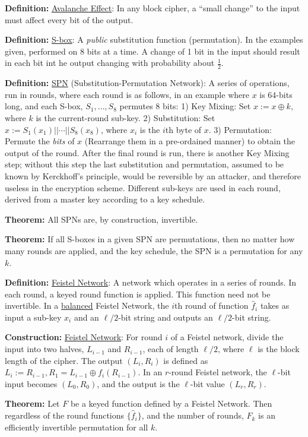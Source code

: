 \documentclass[10pt]{article}
\newcommand{\defn}[1]{{\bf Definition:} \underline{#1}}
\newcommand{\thm}[1]{{\bf Theorem:} \underline{#1}}
\newcommand{\con}[1]{{\bf Construction:} \underline{#1}}
\newcommand{\xor}{\oplus}
\begin{document}
\begin{multicols}{4}
\defn{Avalanche Effect}: In any block cipher, a ``small change'' to the input must affect every bit of the output.

\defn{S-box}: A {\it public} substitution function (permutation). In the examples given, performed on $8$ bits at a time. A change of 1 bit in the input should result in each bit int he output changing with probability about $\frac{1}{2}$.

\defn{SPN} (Substitution-Permutation Network): A series of operations, run in rounds, where each round is as follows, in an example where $x$ is 64-bits long, and each S-box, $S_1,\dots,S_8$ permutes $8$ bits: 1) Key Mixing: Set $x:=x\xor k$, where $k$ is the current-round sub-key. 2) Substitution: Set $x:=S_1(x_1)||\cdots||S_8(x_8)$, where $x_i$ is the $i$th byte of $x$. 3) Permutation: Permute the {\it bits} of $x$ (Rearrange them in a pre-ordained manner) to obtain the output of the round. After the final round is run, there is another Key Mixing step; without this step the last substitution and permutation, assumed to be known by Kerckhoff's principle, would be reversible by an attacker, and therefore useless in the encryption scheme. Different sub-keys are used in each round, derived from a master key according to a key schedule.

\thm{}All SPNs are, by construction, invertible.

\thm{}If all S-boxes in a given SPN are permutations, then no matter how many rounds are applied, and the key schedule, the SPN is a permutation for any $k$.

\defn{Feistel Network}: A network which operates in a series of rounds. In each round, a keyed round function is applied. This function need not be invertible. In a \underline{balanced} Feistel Network, the $i$th round of function $\hat{f}_i$ takes as input a sub-key $x_i$ and an $\ell/2$-bit string and outputs an $\ell/2$-bit string.

\con{Feistel Network}: For round $i$ of a Feistel network, divide the input into two halves, $L_{i-1}$ and $R_{i-1}$, each of length $\ell/2$, where $\ell$ is the block length of the cipher. The output $(L_i,R_i)$ is defined as $L_i:=R_{i-1}, R_1=L_{i-1}\xor f_i(R_{i-1})$. In an $r$-round Feistel network, the $\ell$-bit input becomes $(L_0,R_0)$, and the output is the $\ell$-bit value $(L_r,R_r)$.

\thm{}Let $F$ be a keyed function defined by a Feistel Network. Then regardless of the round functions $\{\hat{f}_i\}$, and the number of rounds, $F_k$ is an efficiently invertible permutation for all $k$.


\end{multicols}
\end{document}
